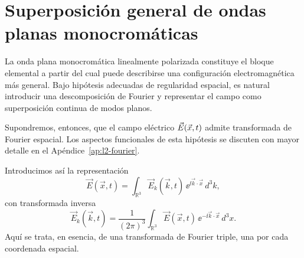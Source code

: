 \documentclass[../main.tex]{subfiles}
\begin{document}
\section{Superposición general de ondas planas monocromáticas}

La onda plana monocromática linealmente polarizada constituye el bloque elemental a partir del cual puede describirse una configuración electromagnética más general. Bajo hipótesis adecuadas de regularidad espacial, es natural introducir una descomposición de Fourier y representar el campo como superposición continua de modos planos.

Supondremos, entonces, que el campo eléctrico $\vec{E}(\vec x,t)$ admite transformada de Fourier espacial. Los aspectos funcionales de esta hipótesis se discuten con mayor detalle en el Apéndice~\ref{ap:l2-fourier}.

Introducimos así la representación
\begin{equation}
    \vec E(\vec x,t)=\int_{\mathbb R^3}\vec E_k(\vec k,t)\,\ee^{\ii\vec k\cdot\vec x}\,d^3k,
    \label{eq:fourier-E-directa}
\end{equation}
con transformada inversa
\begin{equation*}
    \vec E_k(\vec k,t)=\frac{1}{(2\pi)^3}\int_{\mathbb R^3}\vec E(\vec x,t)\,\ee^{-\ii\vec k\cdot\vec x}\,d^3x.
\end{equation*}
Aquí se trata, en esencia, de una transformada de Fourier triple, una por cada coordenada espacial.
\end{document}
